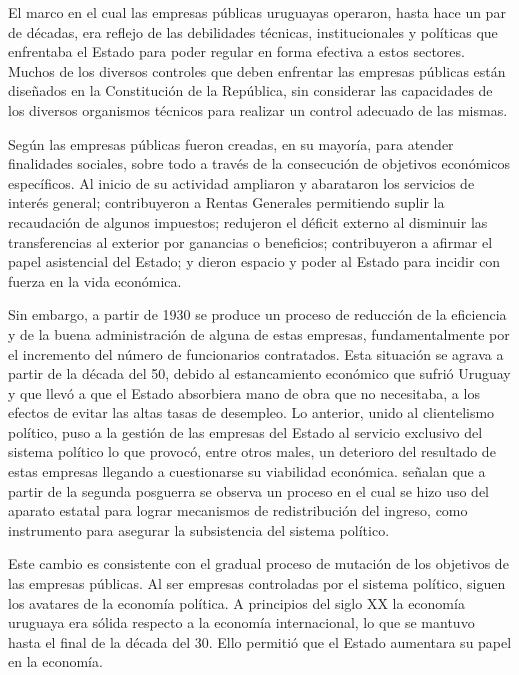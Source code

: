 \documentclass[
  12pt,
  spanish,
]{book}
\begin{document}
El marco en el cual las empresas públicas uruguayas operaron, hasta hace un par de décadas, era reflejo de las debilidades técnicas, institucionales y políticas que enfrentaba el Estado para poder regular en forma efectiva a estos sectores. Muchos de los diversos controles que deben enfrentar las empresas públicas están diseñados en la Constitución de la República, sin considerar las capacidades de los diversos organismos técnicos para realizar un control adecuado de las mismas.

Según \citet{Nahum1993} las empresas públicas fueron creadas, en su mayoría, para atender finalidades sociales, sobre todo a través de la consecución de objetivos económicos específicos. Al inicio de su actividad ampliaron y abarataron los servicios de interés general; contribuyeron a Rentas Generales permitiendo suplir la recaudación de algunos impuestos; redujeron el déficit externo al disminuir las transferencias al exterior por ganancias o beneficios; contribuyeron a afirmar el papel asistencial del Estado; y dieron espacio y poder al Estado para incidir con fuerza en la vida económica.

Sin embargo, a partir de 1930 se produce un proceso de reducción de la eficiencia y de la buena administración de alguna de estas empresas, fundamentalmente por el incremento del número de funcionarios contratados. Esta situación se agrava a partir de la década del 50, debido al estancamiento económico que sufrió Uruguay y que llevó a que el Estado absorbiera mano de obra que no necesitaba, a los efectos de evitar las altas tasas de desempleo. Lo anterior, unido al clientelismo político, puso a la gestión de las empresas del Estado al servicio exclusivo del sistema político lo que provocó, entre otros males, un deterioro del resultado de estas empresas llegando a cuestionarse su viabilidad económica. \citet{Solari1983} señalan que a partir de la segunda posguerra se observa un proceso en el cual se hizo uso del aparato estatal para lograr mecanismos de redistribución del ingreso, como instrumento para asegurar la subsistencia del sistema político.

Este cambio es consistente con el gradual proceso de mutación de los objetivos de las empresas públicas. Al ser empresas controladas por el sistema político, siguen los avatares de la economía política. A principios del siglo XX la economía uruguaya era sólida respecto a la economía internacional, lo que se mantuvo hasta el final de la década del 30. Ello permitió que el Estado aumentara su papel en la economía.
\end{document}
